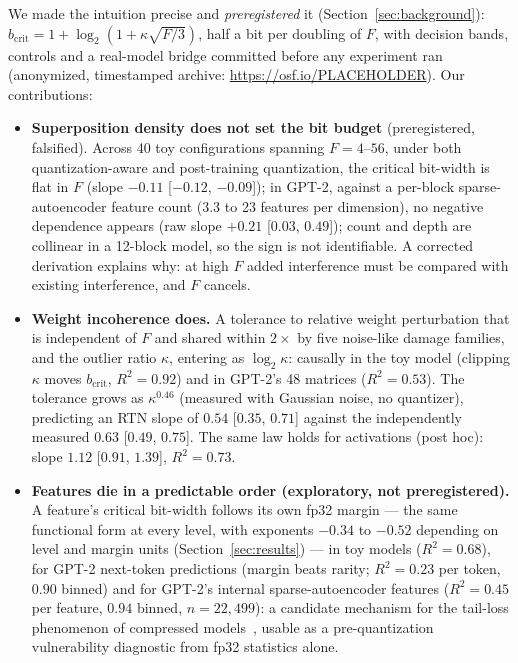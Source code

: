 \documentclass{article}
\begin{document}
We made the intuition precise and \emph{preregistered} it (Section~\ref{sec:background}): $b_{\mathrm{crit}} = 1 +
\log_2(1+\kappa\sqrt{F/3})$, half a bit per doubling of $F$, with decision bands, controls and a real-model bridge committed
before any experiment ran (anonymized, timestamped archive: \url{https://osf.io/PLACEHOLDER}). Our contributions:
\begin{itemize}\setlength\itemsep{2pt}
\item \textbf{Superposition density does not set the bit budget} (preregistered, falsified). Across 40 toy configurations spanning $F = 4$--$56$, under both
quantization-aware and post-training quantization, the critical bit-width is flat in $F$ (slope $-0.11$
[$-0.12$, $-0.09$]); in GPT-2, against a per-block sparse-autoencoder feature count (3.3 to 23 features per dimension), no negative dependence
appears (raw slope $+0.21$ [$0.03$, $0.49$]); count and depth are collinear in a 12-block model, so the sign is not identifiable. A corrected derivation explains why: at high $F$ added interference must be compared with existing interference, and $F$ cancels.
\item \textbf{Weight incoherence does.} A tolerance to relative weight perturbation that is independent of $F$ and
shared within $2\times$ by five noise-like damage families, and the outlier ratio $\kappa$, entering as $\log_2\kappa$: causally in the
toy model (clipping $\kappa$ moves $b_{\mathrm{crit}}$, $R^2=0.92$) and in GPT-2's 48 matrices ($R^2=0.53$). The tolerance grows
as $\kappa^{0.46}$ (measured with Gaussian noise, no quantizer), predicting an RTN slope of $0.54$ [$0.35$, $0.71$] against the
independently measured $0.63$ [$0.49$, $0.75$]. The same law holds for activations (post hoc): slope $1.12$ [$0.91$, $1.39$], $R^2=0.73$.
\item \textbf{Features die in a predictable order (exploratory, not preregistered).} A feature's critical bit-width
follows its own fp32 margin --- the same functional form at every level, with exponents $-0.34$ to $-0.52$ depending on
level and margin units (Section~\ref{sec:results}) --- in toy models ($R^2=0.68$), for GPT-2 next-token
predictions (margin beats rarity; $R^2=0.23$ per token, $0.90$ binned) and for GPT-2's internal sparse-autoencoder
features ($R^2=0.45$ per feature, $0.94$ binned, $n=22{,}499$): a candidate mechanism for the tail-loss phenomenon of compressed
models~\cite{hooker2019,hooker2020}, usable as a pre-quantization vulnerability diagnostic from fp32 statistics alone.
\end{itemize}
\end{document}
